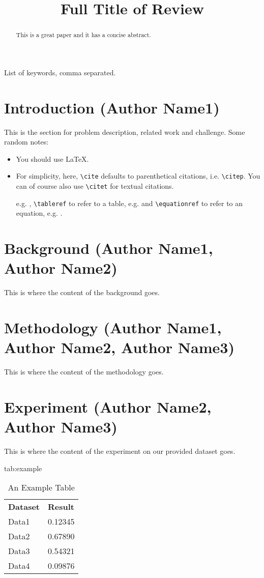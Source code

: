 \documentclass{MLIA} %
\title[Short Title]{Full Title of Review}
\begin{document}
\maketitle

\begin{abstract}
This is a great paper and it has a concise abstract.
\end{abstract}

\begin{keywords}
List of keywords, comma separated.
\end{keywords}

\section{Introduction (Author Name1)}

This is the section for problem description, related work and challenge.  Some random notes:
\begin{itemize}
\item You should use \LaTeX \cite{Lamport:Book:1989}.
\item For simplicity, here, \verb|\cite|  defaults to
  parenthetical citations, i.e. \verb|\citep|. You can of course also
  use \verb|\citet| for textual citations.

e.g. ,  \verb|\tableref| to refer to a table,
e.g.  and \verb|\equationref| to refer to an equation,
e.g. .
\end{itemize}
\section{Background (Author Name1, Author Name2)}
This is where the content of the background goes.  

\section{Methodology (Author Name1, Author Name2, Author Name3)}
This is where the content of the methodology goes.  

\section{Experiment (Author Name2, Author Name3)}
This is where the content of the experiment on our provided dataset goes.  

\begin{table}[htbp]
\floatconts
  {tab:example}%
  {\caption{An Example Table}}%
  {\begin{tabular}{ll}
  \bfseries Dataset & \bfseries Result\\
  Data1 & 0.12345\\
  Data2 & 0.67890\\
  Data3 & 0.54321\\
  Data4 & 0.09876
  \end{tabular}}
\end{table}
\end{document}

